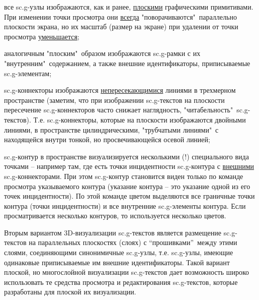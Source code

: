 \begin{SCn}
{\begin{scnitemize}
\item все sc.g-узлы изображаются, как и ранее, \uline{плоскими} графическими примитивами. При изменении точки просмотра они \uline{всегда} "поворачиваются"\ параллельно плоскости экрана, но их масштаб (размер на экране) при удалении от  точки просмотра \uline{уменьшается};
\item аналогичным "плоским"\ образом изображаются sc.g-рамки с их "внутренним"\ содержанием, а также внешние идентификаторы, приписываемые sc.g-элементам;
\item sc.g-коннекторы изображаются \uline{непересекающимися} линиями в трехмерном пространстве (заметим, что при изображении sc.g-текстов на плоскости пересечение sc.g-коннекторов часто снижает наглядность, "читабельность"\ sc.g-текстов). Т.е. sc.g-коннекторы, которые на плоскости изображаются двойными линиями, в пространстве  цилиндрическими, "трубчатыми линиями"\ с находящейся внутри тонкой, но просвечивающейся осевой линией;
\item sc.g-контур в пространстве визуализируется несколькими (!) специального вида точками -- например там, где есть точки инцидентности sc.g-контура с \uline{внешними} sc.g-коннекторами. При этом sc.g-контур становится виден только по команде просмотра указываемого контура (указание контура – это указание одной из его точек инцидентности). По этой команде цветом выделяются все граничные точки контура (точки инцидентности) и все внутренние sc.g-элементы контура. Если просматривается  несколько контуров, то используется несколько цветов.
\end{scnitemize}

Вторым вариантом 3D-визуализации sc.g-текстов является размещение sc.g-текстов на параллельных плоскостях (слоях) с “прошивками”\ между этими слоями, соединяющими синонимичные sc.g-узлы, т.е. sc.g-узлы, имеющие одинаковые приписываемые им внешние идентификаторы. Такой вариант плоской, но многослойной визуализации sc.g-текстов дает возможность широко использовать те средства просмотра и редактирования sc.g-текстов, которые разработаны для плоской их визуализации.}

\scnendstruct

\scnstartsubstruct
\bigskip
{}
\end{SCn}
